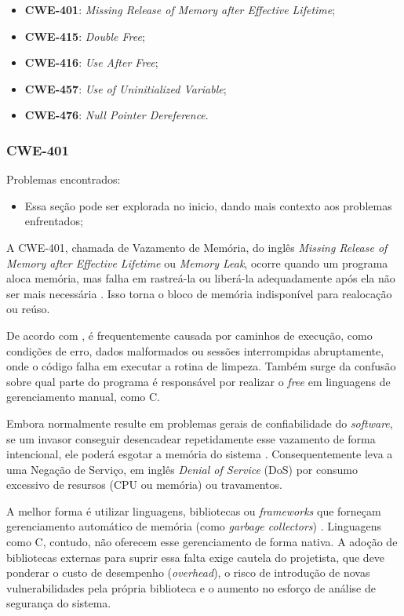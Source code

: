 \documentclass[
    12pt,                %
    openright,           %
    oneside,             %
    a4paper,             %
    english,             %
    brazil               %
]{abntex2}
\begin{document}
\begin{itemize}
\begin{itemize}
  \item \textbf{CWE-401}: \textit{Missing Release of Memory after Effective Lifetime}; 
  \item \textbf{CWE-415}: \textit{Double Free}; 
  \item \textbf{CWE-416}: \textit{Use After Free}; 
  \item \textbf{CWE-457}: \textit{Use of Uninitialized Variable};
  \item \textbf{CWE-476}: \textit{Null Pointer Dereference}. 
\end{itemize}

\subsubsection{CWE-401}
\label{sec:401}

\par
Problemas encontrados:

\begin{itemize}
  \item Essa seção pode ser explorada no inicio, dando mais contexto aos problemas enfrentados;
\end{itemize}


\par
A CWE-401, chamada de Vazamento de Memória, do inglês \textit{Missing Release of Memory after Effective Lifetime} ou \textit{Memory Leak}, ocorre quando um programa aloca memória, mas falha em rastreá-la ou liberá-la adequadamente após ela não ser mais necessária \cite{cwe401}. 
Isso torna o bloco de memória indisponível para realocação ou reúso.
\par
De acordo com , é frequentemente causada por caminhos de execução, como condições de erro, dados malformados ou sessões interrompidas abruptamente, onde o código falha em executar a rotina de limpeza.
Também surge da confusão sobre qual parte do programa é responsável por realizar o \textit{free} em linguagens de gerenciamento manual, como C.
\par
Embora normalmente resulte em problemas gerais de confiabilidade do \textit{software}, se um invasor conseguir desencadear repetidamente esse vazamento de forma intencional, ele poderá esgotar a memória do sistema \cite{cwe401}.
Consequentemente leva a uma Negação de Serviço, em inglês \textit{Denial of Service} (DoS) por consumo excessivo de resursos (CPU ou memória) ou travamentos.
\par
A melhor forma é utilizar linguagens, bibliotecas ou \textit{frameworks} que forneçam gerenciamento automático de memória (como \textit{garbage collectors}) \cite{cwe401}.
Linguagens como C, contudo, não oferecem esse gerenciamento de forma nativa.
A adoção de bibliotecas externas para suprir essa falta exige cautela do projetista, que deve ponderar o custo de desempenho (\textit{overhead}), o risco de introdução de novas vulnerabilidades pela própria biblioteca e o aumento no esforço de análise de segurança do sistema.


\end{itemize}
\end{document}
